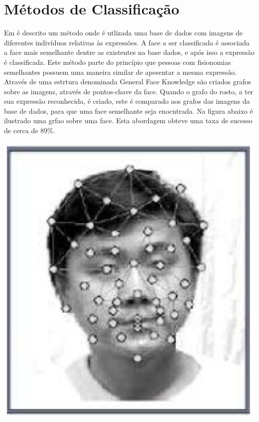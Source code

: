\section{Métodos de Classificação}
Em  é descrito um método onde é utlizada uma base de dados com imagens de diferentes indivíduos relativas às expressões. A face a ser classificada é associada a face mais semelhante dentre as existentes na base dados, e após isso a expressão é classificada. Este método parte do princípio que pessoas com fisionomias semelhantes possuem uma maneira similar de apesentar a mesma expressão. Através de uma estrtura denominada General Face Knowledge são criados grafos sobre as imagens, através de pontos-chave da face. Quando o grafo do rosto, a ter sua expressão reconhecida, é criado, este é comparado aos grafos das imagens da base de dados, para que uma face semelhante seja enocntrada. Na figura abaixo é ilustrado uma grfao sobre uma face. Esta abordagem obteve uma taxa de sucesso de cerca de 89\%.
\begin{center}
	\includegraphics[scale=1.00]{graficos/metodo1_classi}
\end{center}

